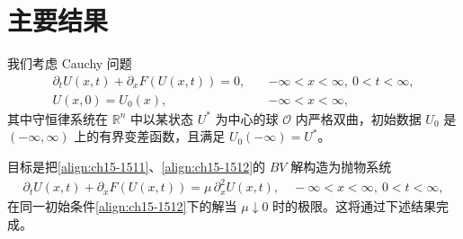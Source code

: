 \documentclass[../../main.tex]{subfiles}
\begin{document}
\section{主要结果}\label{section:ch15-主要结果}

我们考虑 Cauchy 问题
\begin{align}
\partial_t U(x,t)+\partial_x F(U(x,t))=0,\quad&-\infty<x<\infty,\ 0<t<\infty,
\label{align:ch15-1511}\\
U(x,0)=U_0(x),\quad&-\infty<x<\infty,
\label{align:ch15-1512}
\end{align}
其中守恒律系统在 $\mathbb{R}^n$ 中以某状态 $U^*$ 为中心的球 $\mathscr{O}$ 内严格双曲，初始数据 $U_0$ 是 $(-\infty,\infty)$ 上的有界变差函数，且满足 $U_0(-\infty)=U^*$。

目标是把\eqref{align:ch15-1511}、\eqref{align:ch15-1512}的 $BV$ 解构造为抛物系统
\begin{align}
\partial_t U(x,t)+\partial_x F(U(x,t))=\mu\,\partial_x^2U(x,t),\quad-\infty<x<\infty,\ 0<t<\infty,
\label{align:ch15-1513}
\end{align}
在同一初始条件\eqref{align:ch15-1512}下的解当 $\mu\downarrow0$ 时的极限。这将通过下述结果完成。
\end{document}
